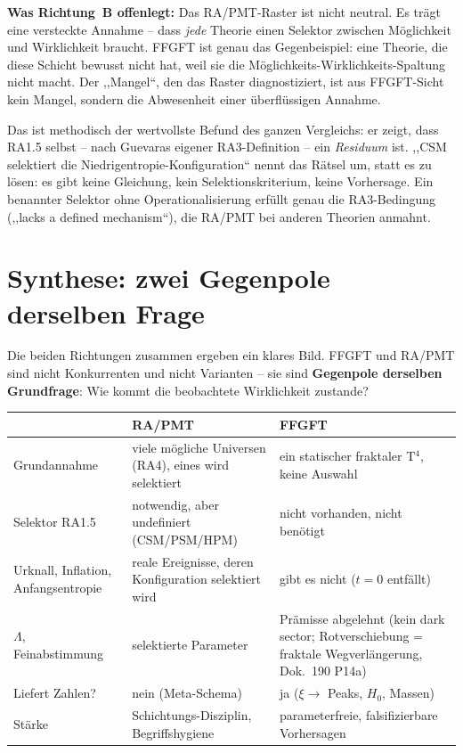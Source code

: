 \textbf{Was Richtung~B offenlegt:} Das RA/PMT-Raster ist nicht neutral.
Es trägt eine versteckte Annahme -- dass \emph{jede} Theorie einen
Selektor zwischen Möglichkeit und Wirklichkeit braucht. FFGFT ist genau
das Gegenbeispiel: eine Theorie, die diese Schicht bewusst nicht hat,
weil sie die Möglichkeits-Wirklichkeits-Spaltung nicht macht. Der
,,Mangel``, den das Raster diagnostiziert, ist aus FFGFT-Sicht kein
Mangel, sondern die Abwesenheit einer überflüssigen Annahme.

Das ist methodisch der wertvollste Befund des ganzen Vergleichs: er
zeigt, dass RA1.5 selbst -- nach Guevaras eigener RA3-Definition -- ein
\emph{Residuum} ist. ,,CSM selektiert die Niedrigentropie-Konfiguration``
nennt das Rätsel um, statt es zu lösen: es gibt keine Gleichung, kein
Selektionskriterium, keine Vorhersage. Ein benannter Selektor ohne
Operationalisierung erfüllt genau die RA3-Bedingung (,,lacks a defined
mechanism``), die RA/PMT bei anderen Theorien anmahnt.

\section{Synthese: zwei Gegenpole derselben Frage}

Die beiden Richtungen zusammen ergeben ein klares Bild. FFGFT und
RA/PMT sind nicht Konkurrenten und nicht Varianten -- sie sind
\textbf{Gegenpole derselben Grundfrage}: Wie kommt die beobachtete
Wirklichkeit zustande?

\begin{center}
\begin{tabular}{p{4cm}p{4cm}p{4cm}}
\toprule
 & \textbf{RA/PMT} & \textbf{FFGFT} \\
\midrule
Grundannahme & viele mögliche Universen (RA4), eines wird selektiert &
  ein statischer fraktaler T$^4$, keine Auswahl \\
\addlinespace
Selektor RA1.5 & notwendig, aber undefiniert (CSM/PSM/HPM) &
  nicht vorhanden, nicht benötigt \\
\addlinespace
Urknall, Inflation, Anfangsentropie & reale Ereignisse, deren
  Konfiguration selektiert wird & gibt es nicht ($t=0$ entfällt) \\
\addlinespace
$\Lambda$, Feinabstimmung & selektierte Parameter &
  Prämisse abgelehnt (kein dark sector; Rotverschiebung =
  fraktale Wegverlängerung, Dok.~190 P14a) \\
\addlinespace
Liefert Zahlen? & nein (Meta-Schema) & ja ($\xi \to$ Peaks, $H_0$, Massen) \\
\addlinespace
Stärke & Schichtungs-Disziplin, Begriffshygiene &
  parameterfreie, falsifizierbare Vorhersagen \\
\bottomrule
\end{tabular}
\end{center}

